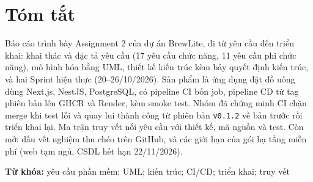\chapter*{Tóm tắt}
Báo cáo trình bày Assignment 2 của dự án BrewLite, đi từ yêu cầu đến triển khai: khai thác và đặc tả yêu cầu (17 yêu cầu chức năng, 11 yêu cầu phi chức năng), mô hình hóa bằng UML, thiết kế kiến trúc kèm bảy quyết định kiến trúc, và hai Sprint hiện thực (20--26/10/2026). Sản phẩm là ứng dụng đặt đồ uống dùng Next.js, NestJS, PostgreSQL, có pipeline CI bốn job, pipeline CD từ tag phiên bản lên GHCR và Render, kèm smoke test. Nhóm đã chứng minh CI chặn merge khi test lỗi và quay lui thành công từ phiên bản \texttt{v0.1.2} về bản trước rồi triển khai lại. Ma trận truy vết nối yêu cầu với thiết kế, mã nguồn và test. Còn mở: dấu vết nghiệm thu chéo trên GitHub, và các giới hạn của gói hạ tầng miễn phí (web tạm ngủ, CSDL hết hạn 22/11/2026).

\vspace{6pt}
\noindent\textbf{Từ khóa:} yêu cầu phần mềm; UML; kiến trúc; CI/CD; triển khai; truy vết
